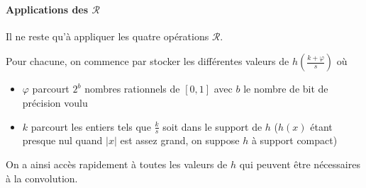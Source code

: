 	\paragraph{Applications des $\mathcal R$}
		
		Il ne reste qu'à appliquer les quatre opérations $\mathcal R$.
		
		Pour chacune, on commence par stocker les différentes valeurs de $h(\frac{k+\varphi}{s})$ où
		\begin{itemize}
		\item $\varphi$ parcourt $2^b$ nombres rationnels de $[0,1]$ avec $b$ le nombre de bit de précision voulu
		\item $k$ parcourt les entiers tels que $\frac{k}{s}$ soit dans le support de $h$ ($h(x)$ étant presque nul quand $|x|$ est assez grand, on suppose $h$ à support compact)
		\end{itemize}
		On a ainsi accès rapidement à toutes les valeurs de $h$ qui peuvent être nécessaires à la convolution.
